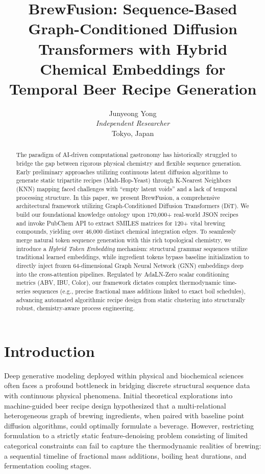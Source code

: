 \documentclass[10pt,twocolumn,letterpaper]{article}
\title{BrewFusion: Sequence-Based Graph-Conditioned Diffusion Transformers with Hybrid Chemical Embeddings for Temporal Beer Recipe Generation}
\author{
Junyeong Yong\\
\textit{Independent Researcher}\\
Tokyo, Japan
}
\begin{document}
\maketitle

\begin{abstract}
The paradigm of AI-driven computational gastronomy has historically struggled to bridge the gap between rigorous physical chemistry and flexible sequence generation. Early preliminary approaches utilizing continuous latent diffusion algorithms to generate static tripartite recipes (Malt-Hop-Yeast) through K-Nearest Neighbors (KNN) mapping faced challenges with ``empty latent voids'' and a lack of temporal processing structure. In this paper, we present BrewFusion, a comprehensive architectural framework utilizing Graph-Conditioned Diffusion Transformers (DiT). We build our foundational knowledge ontology upon 170,000+ real-world JSON recipes and invoke PubChem API to extract SMILES matrices for 120+ vital brewing compounds, yielding over 46,000 distinct chemical integration edges. To seamlessly merge natural token sequence generation with this rich topological chemistry, we introduce a \textit{Hybrid Token Embedding} mechanism: structural grammar sequences utilize traditional learned embeddings, while ingredient tokens bypass baseline initialization to directly inject frozen 64-dimensional Graph Neural Network (GNN) embeddings deep into the cross-attention pipelines. Regulated by AdaLN-Zero scalar conditioning metrics (ABV, IBU, Color), our framework dictates complex thermodynamic time-series sequences (e.g., precise fractional mass additions linked to exact boil schedules), advancing automated algorithmic recipe design from static clustering into structurally robust, chemistry-aware process engineering.
\end{abstract}

\section{Introduction}
Deep generative modeling deployed within physical and biochemical sciences often faces a profound bottleneck in bridging discrete structural sequence data with continuous physical phenomena. Initial theoretical explorations into machine-guided beer recipe design hypothesized that a multi-relational heterogeneous graph of brewing ingredients, when paired with baseline point diffusion algorithms, could optimally formulate a beverage. However, restricting formulation to a strictly static feature-denoising problem consisting of limited categorical constraints can fail to capture the thermodynamic realities of brewing: a sequential timeline of fractional mass additions, boiling heat durations, and fermentation cooling stages.
\end{document}
